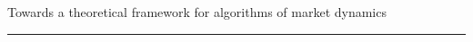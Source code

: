 \documentclass{article}
\newcommand{\soptitle}{Towards a theoretical framework for algorithms of market dynamics}
\newcommand{\substatement}[1]{\par\medskip
  {\emph{#1.}}\space
}
\begin{document}
\begin{center}
\LARGE\soptitle%
\end{center}

\hrule

\bigskip






\end{document}
